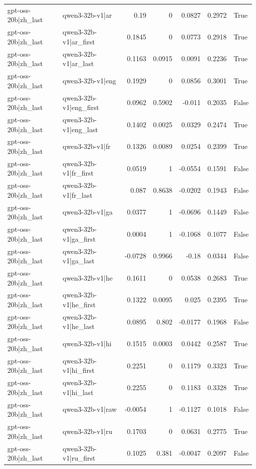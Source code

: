 \begin{table}
\begin{tabular}{l l r r r r l}
gpt-oss-20b|zh_last & qwen3-32b-v1|ar & 0.19 & 0 & 0.0827 & 0.2972 & True \\
gpt-oss-20b|zh_last & qwen3-32b-v1|ar_first & 0.1845 & 0 & 0.0773 & 0.2918 & True \\
gpt-oss-20b|zh_last & qwen3-32b-v1|ar_last & 0.1163 & 0.0915 & 0.0091 & 0.2236 & True \\
gpt-oss-20b|zh_last & qwen3-32b-v1|eng & 0.1929 & 0 & 0.0856 & 0.3001 & True \\
gpt-oss-20b|zh_last & qwen3-32b-v1|eng_first & 0.0962 & 0.5902 & -0.011 & 0.2035 & False \\
gpt-oss-20b|zh_last & qwen3-32b-v1|eng_last & 0.1402 & 0.0025 & 0.0329 & 0.2474 & True \\
gpt-oss-20b|zh_last & qwen3-32b-v1|fr & 0.1326 & 0.0089 & 0.0254 & 0.2399 & True \\
gpt-oss-20b|zh_last & qwen3-32b-v1|fr_first & 0.0519 & 1 & -0.0554 & 0.1591 & False \\
gpt-oss-20b|zh_last & qwen3-32b-v1|fr_last & 0.087 & 0.8638 & -0.0202 & 0.1943 & False \\
gpt-oss-20b|zh_last & qwen3-32b-v1|ga & 0.0377 & 1 & -0.0696 & 0.1449 & False \\
gpt-oss-20b|zh_last & qwen3-32b-v1|ga_first & 0.0004 & 1 & -0.1068 & 0.1077 & False \\
gpt-oss-20b|zh_last & qwen3-32b-v1|ga_last & -0.0728 & 0.9966 & -0.18 & 0.0344 & False \\
gpt-oss-20b|zh_last & qwen3-32b-v1|he & 0.1611 & 0 & 0.0538 & 0.2683 & True \\
gpt-oss-20b|zh_last & qwen3-32b-v1|he_first & 0.1322 & 0.0095 & 0.025 & 0.2395 & True \\
gpt-oss-20b|zh_last & qwen3-32b-v1|he_last & 0.0895 & 0.802 & -0.0177 & 0.1968 & False \\
gpt-oss-20b|zh_last & qwen3-32b-v1|hi & 0.1515 & 0.0003 & 0.0442 & 0.2587 & True \\
gpt-oss-20b|zh_last & qwen3-32b-v1|hi_first & 0.2251 & 0 & 0.1179 & 0.3323 & True \\
gpt-oss-20b|zh_last & qwen3-32b-v1|hi_last & 0.2255 & 0 & 0.1183 & 0.3328 & True \\
gpt-oss-20b|zh_last & qwen3-32b-v1|raw & -0.0054 & 1 & -0.1127 & 0.1018 & False \\
gpt-oss-20b|zh_last & qwen3-32b-v1|ru & 0.1703 & 0 & 0.0631 & 0.2775 & True \\
gpt-oss-20b|zh_last & qwen3-32b-v1|ru_first & 0.1025 & 0.381 & -0.0047 & 0.2097 & False \\

\end{tabular}
\end{table}
